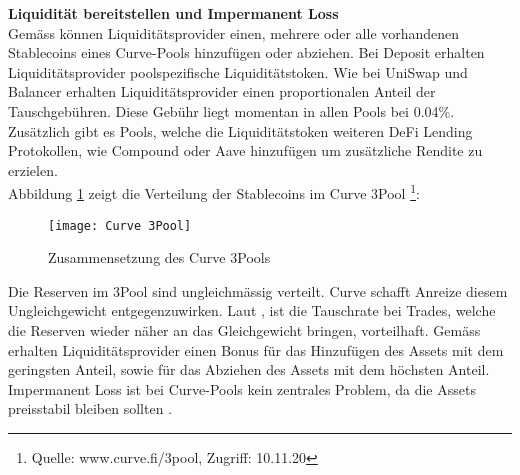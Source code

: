 \documentclass[12pt,a4paper,titlepage,oneside,english]{article}
\begin{document}
\textbf{Liquidität bereitstellen und Impermanent Loss}\\
Gemäss \citet{charlie2020} können Liquiditätsprovider einen, mehrere oder alle vorhandenen Stablecoins eines Curve-Pools hinzufügen oder abziehen. Bei Deposit erhalten Liquiditätsprovider poolspezifische Liquiditätstoken.
Wie bei UniSwap und Balancer erhalten Liquiditätsprovider einen proportionalen Anteil der Tauschgebühren. Diese Gebühr liegt momentan in allen Pools bei 0.04\%. Zusätzlich gibt es Pools, welche die Liquiditätstoken weiteren DeFi Lending Protokollen, wie Compound oder Aave hinzufügen um zusätzliche Rendite zu erzielen. \citep{charlie2020} \\
Abbildung \ref{fig:Pool} zeigt die Verteilung der Stablecoins im Curve 3Pool \footnote{Quelle: www.curve.fi/3pool, Zugriff: 10.11.20}:\\

\begin{figure}[h!]
\begin{center}
\texttt{[image: Curve 3Pool]}
\caption{Zusammensetzung des Curve 3Pools} \label{fig:Pool}
\end{center}
\end{figure} 
Die Reserven im 3Pool sind ungleichmässig verteilt. 
Curve schafft Anreize diesem Ungleichgewicht entgegenzuwirken. Laut \cite{Zhang2020}, ist die Tauschrate bei Trades, welche die Reserven wieder näher an das Gleichgewicht bringen, vorteilhaft. Gemäss \cite{charlie2020} erhalten Liquiditätsprovider einen Bonus für das Hinzufügen des Assets mit dem geringsten Anteil, sowie für das Abziehen des Assets mit dem höchsten Anteil.\\
Impermanent Loss ist bei Curve-Pools kein zentrales Problem, da die Assets preisstabil bleiben sollten \citep{Reimi2020}.
\end{document}
